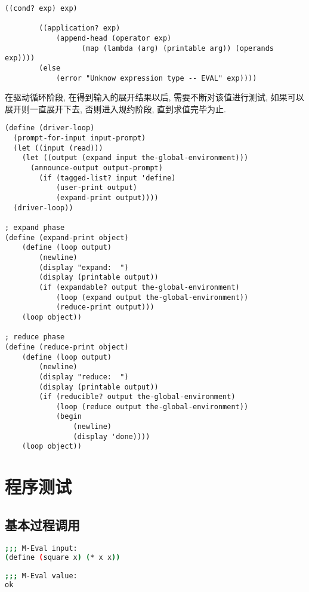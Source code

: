 \documentclass{article}
\begin{document}
\begin{CJK*}{UTF8}{gkai}
\begin{lstlisting}[basicstyle=\scriptsize\ttfamily\bfseries]
        ((cond? exp) exp)

        ((application? exp)
            (append-head (operator exp)
                  (map (lambda (arg) (printable arg)) (operands exp))))
        (else
            (error "Unknow expression type -- EVAL" exp))))
\end{lstlisting}


在驱动循环阶段, 在得到输入的展开结果以后, 需要不断对该值进行测试, 如果可以展开则一直展开下去, 否则进入规约阶段, 直到求值完毕为止.

\begin{lstlisting}[basicstyle=\scriptsize\ttfamily\bfseries]
(define (driver-loop)
  (prompt-for-input input-prompt)
  (let ((input (read)))
    (let ((output (expand input the-global-environment)))
      (announce-output output-prompt)
        (if (tagged-list? input 'define)
            (user-print output)
            (expand-print output))))
  (driver-loop))
  
; expand phase
(define (expand-print object)
    (define (loop output)
        (newline)
        (display "expand:  ")
        (display (printable output))
        (if (expandable? output the-global-environment)
            (loop (expand output the-global-environment))
            (reduce-print output)))
    (loop object))

; reduce phase
(define (reduce-print object)
    (define (loop output)
        (newline)
        (display "reduce:  ")
        (display (printable output))
        (if (reducible? output the-global-environment)
            (loop (reduce output the-global-environment))
            (begin
                (newline)
                (display 'done))))
    (loop object))
\end{lstlisting}

\section{程序测试}

\subsection{基本过程调用}

\begin{lstlisting}[language=bash, numbers=none, backgroundcolor=\color{black}, basicstyle=\scriptsize\color{green}\ttfamily\bfseries]
;;; M-Eval input:
(define (square x) (* x x))

;;; M-Eval value:
ok


\end{lstlisting}
\end{CJK*}
\end{document}
